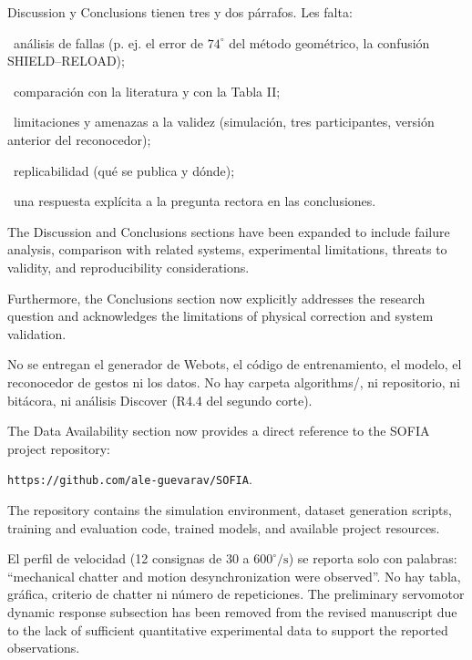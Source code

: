 \documentclass{LabDSTresponse}
\begin{document}
	{Discussion y Conclusions tienen tres
		y dos párrafos. Les falta:
		
		\par\noindent\textbullet\ análisis de fallas
		(p. ej. el error de $74^\circ$ del método
		geométrico, la confusión SHIELD--RELOAD);
		
		\par\noindent\textbullet\ comparación con
		la literatura y con la Tabla II;
		
		\par\noindent\textbullet\ limitaciones
		y amenazas a la validez (simulación,
		tres participantes, versión anterior
		del reconocedor);
		
		\par\noindent\textbullet\ replicabilidad
		(qué se publica y dónde);
		
		\par\noindent\textbullet\ una respuesta
		explícita a la pregunta rectora
		en las conclusiones.}
	{The Discussion and Conclusions sections
		have been expanded to include failure analysis,
		comparison with related systems, experimental
		limitations, threats to validity, and
		reproducibility considerations.
		
		Furthermore, the Conclusions section now
		explicitly addresses the research question
		and acknowledges the limitations of physical
		correction and system validation.}
	
	{No se entregan el generador de Webots,
		el código de entrenamiento, el modelo,
		el reconocedor de gestos ni los datos.
		No hay carpeta algorithms/, ni repositorio,
		ni bitácora, ni análisis Discover
		(R4.4 del segundo corte).}
	{The Data Availability section now provides a direct reference to the SOFIA project repository:
		
	\texttt{https://github.com/ale-guevarav/SOFIA}.
		
	The repository contains the simulation environment, dataset generation scripts, training and evaluation code, trained models, and available project resources.}
	
	{El perfil de velocidad (12 consignas
		de $30$ a $600^\circ/\mathrm{s}$)
		se reporta solo con palabras:
		``mechanical chatter and motion
		desynchronization were observed''.
		No hay tabla, gráfica, criterio
		de chatter ni número de repeticiones.}
	{The preliminary servomotor dynamic response subsection has been removed from the revised manuscript due to the lack of sufficient quantitative experimental data to support the reported observations.}
	
	
\end{document}
